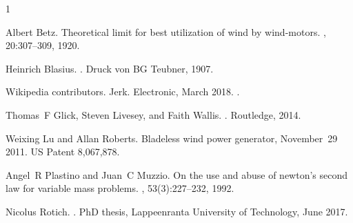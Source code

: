 %
%

\begin{singlespace}
\begin{thebibliography}{1}
	
	Albert Betz.
	\newblock Theoretical limit for best utilization of wind by wind-motors.
	, 20:307--309, 1920.
	
	Heinrich Blasius.
	.
	\newblock Druck von BG Teubner, 1907.
	
	Wikipedia contributors.
	\newblock Jerk.
	\newblock Electronic, March 2018.
	.
	
	Thomas~F Glick, Steven Livesey, and Faith Wallis.
	.
	\newblock Routledge, 2014.
	
	Weixing Lu and Allan Roberts.
	\newblock Bladeless wind power generator, November~29 2011.
	\newblock US Patent 8,067,878.
	
	Angel~R Plastino and Juan~C Muzzio.
	\newblock On the use and abuse of newton's second law for variable mass
	problems.
	, 53(3):227--232,
	1992.
	
	Nicolus Rotich.
	.
	\newblock PhD thesis, Lappeenranta University of Technology, June 2017.
	
\end{thebibliography}
\end{singlespace}




   